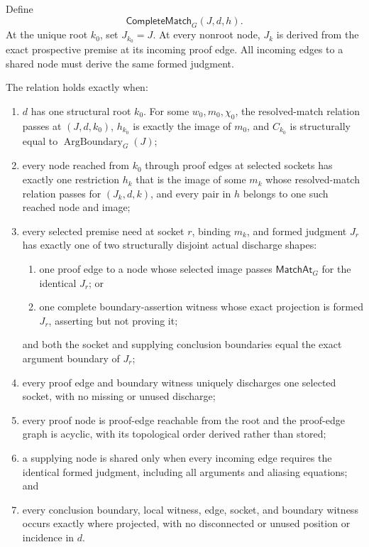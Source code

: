 \documentclass[11pt,twoside]{article}
\newcommand{\MatchAt}{\mathsf{MatchAt}}
\newcommand{\CompleteMatch}{\mathsf{CompleteMatch}}
\begin{document}
Define
\[
  \CompleteMatch_G(J,d,h).
\]
At the unique root \(k_0\), set \(J_{k_0}=J\).  At every nonroot node,
\(J_k\) is derived from the exact prospective premise at its incoming proof edge.
All incoming edges to a shared node must derive the same formed judgment.

The relation holds exactly when:

\begin{enumerate}[leftmargin=2.2em]
  \item \(d\) has one structural root \(k_0\).  For some
        \(w_0,m_0,\chi_0\), the resolved-match relation passes at
        \((J,d,k_0)\), \(h_{k_0}\) is exactly the image of \(m_0\), and
        \(C_{k_0}\) is structurally equal to
        \(\operatorname{ArgBoundary}_G(J)\);
  \item every node reached from \(k_0\) through proof edges at selected sockets
        has exactly one restriction \(h_k\) that is the image of some \(m_k\)
        whose resolved-match relation passes for \((J_k,d,k)\), and every pair in
        \(h\) belongs to one such reached node and image;
  \item every selected premise need at socket \(r\), binding \(m_k\), and formed
        judgment \(J_r\) has exactly one of two structurally disjoint actual
        discharge shapes:
        \begin{enumerate}[label=\alph*.,leftmargin=2em]
          \item one proof edge to a node whose selected image passes
                \(\MatchAt_G\) for the identical \(J_r\); or
          \item one complete boundary-assertion witness whose exact projection is
                formed \(J_r\), asserting but not proving it;
        \end{enumerate}
        and both the socket and supplying conclusion boundaries equal the exact
        argument boundary of \(J_r\);
  \item every proof edge and boundary witness uniquely discharges one selected
        socket, with no missing or unused discharge;
  \item every proof node is proof-edge reachable from the root and the proof-edge
        graph is acyclic, with its topological order derived rather than stored;
  \item a supplying node is shared only when every incoming edge requires the
        identical formed judgment, including all arguments and aliasing equations;
        and
  \item every conclusion boundary, local witness, edge, socket, and boundary
        witness occurs exactly where projected, with no disconnected or unused
        position or incidence in \(d\).
\end{enumerate}
\end{document}
